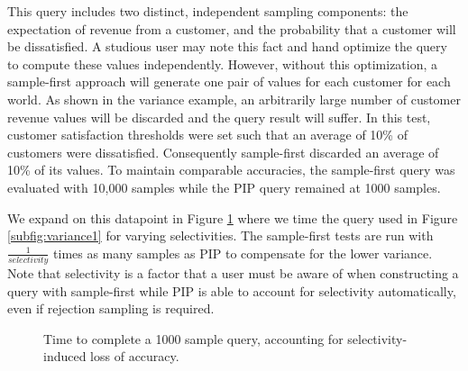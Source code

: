 This query includes two distinct, independent sampling components: the expectation of revenue from a customer, and the probability that a customer will be dissatisfied.  A studious user may note this fact and hand optimize the query to compute these values independently.  However, without this optimization, a sample-first approach will generate one pair of values for each customer for each world.  As shown in the variance example, an arbitrarily large number of customer revenue values will be discarded and the query result will suffer.  In this test, customer satisfaction thresholds were set such that an average of 10\% of customers were dissatisfied.  Consequently sample-first discarded an average of 10\% of its values.  To maintain comparable accuracies, the sample-first query was evaluated with 10,000 samples while the PIP query remained at 1000 samples. 

We expand on this datapoint in Figure \ref{fig:scaling_selectivity} where we time the query used in Figure \ref{subfig:variance1} for varying selectivities.  The sample-first tests are run with $\frac{1}{selectivity}$ times as many samples as PIP to compensate for the lower variance.  Note that selectivity is a factor that a user must be aware of when constructing a query with sample-first while PIP is able to account for selectivity automatically, even if rejection sampling is required.

\begin{figure}
\begin{center}
\caption{Time to complete a 1000 sample query, accounting for selectivity-induced loss of accuracy.}
\label{fig:scaling_selectivity}
\end{center}
\end{figure}

